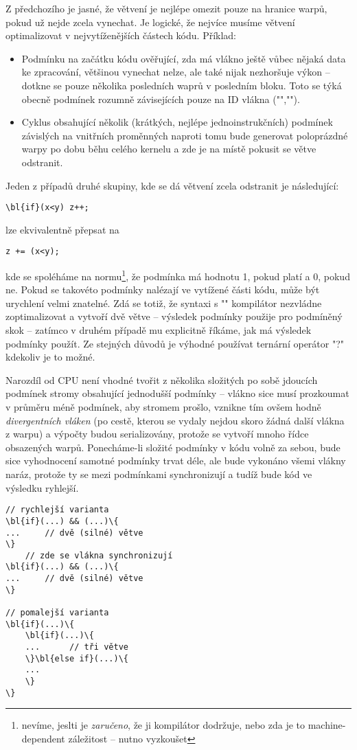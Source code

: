         Z předchozího je jasné, že větvení je nejlépe omezit pouze na hranice warpů, pokud už nejde zcela vynechat. Je logické, že nejvíce musíme větvení optimalizovat v nejvytíženějších částech kódu. Příklad:
        \begin{itemize}
        \item Podmínku na začátku kódu ověřující, zda má vlákno ještě vůbec nějaká data ke zpracování, většinou vynechat nelze, ale také nijak nezhoršuje výkon -- dotkne se pouze několika posledních waprů v posledním bloku. Toto se týká obecně podmínek rozumně závisejících pouze na ID vlákna (\Vr"",\Vr"").
        \item Cyklus obsahující několik (krátkých, nejlépe jednoinstrukčních) podmínek závislých na vnitřních proměnných naproti tomu bude generovat poloprázdné warpy po dobu běhu celého kernelu a zde je na místě pokusit se větve odstranit.
        \end{itemize}
        Jeden z případů druhé skupiny, kde se dá větvení zcela odstranit je následující:
        \begin{Verbatim}[commandchars = \\\{\}]
\bl{if}(x<y) z++;
        \end{Verbatim}
        lze ekvivalentně přepsat na
        \begin{Verbatim}[commandchars = \\\{\}]
z += (x<y);
        \end{Verbatim}
        kde se spoléháme na normu\footnote{nevíme, jeslti je \emph{zaručeno}, že ji kompilátor dodržuje, nebo zda je to machine-dependent záležitost -- nutno vyzkoušet}, že podmínka má hodnotu 1, pokud platí a 0, pokud ne. Pokud se takovéto podmínky nalézají ve vytížené části kódu, může být urychlení velmi znatelné. Zdá se totiž, že syntaxi s \Vr"" kompilátor nezvládne zoptimalizovat a vytvoří dvě větve -- výsledek podmínky použije pro podmíněný skok -- zatímco v druhém případě mu explicitně říkáme, jak má výsledek podmínky použít. Ze stejných důvodů je výhodné používat ternární operátor \Vr"?" kdekoliv je to možné.

        Narozdíl od CPU není vhodné tvořit z několika složitých po sobě jdoucích podmínek stromy obsahující jednodušší podmínky -- vlákno sice musí prozkoumat v průměru méně podmínek, aby stromem prošlo, vznikne tím ovšem hodně \emph{divergentních vláken} (po cestě, kterou se vydaly nejdou skoro žádná další vlákna z warpu) a výpočty budou serializovány, protože se vytvoří mnoho řídce obsazených warpů. Ponecháme-li složité podmínky v kódu volně za sebou, bude sice vyhodnocení samotné podmínky trvat déle, ale bude vykonáno všemi vlákny naráz, protože ty se mezi podmínkami synchronizují a tudíž bude kód ve výsledku ryhlejší.
        \begin{Verbatim}[commandchars = \\\{\}]
// rychlejší varianta
\bl{if}(...) && (...)\{
...     // dvě (silné) větve
\}
    // zde se vlákna synchronizují
\bl{if}(...) && (...)\{
...     // dvě (silné) větve
\}

// pomalejší varianta
\bl{if}(...)\{
    \bl{if}(...)\{
    ...      // tři větve
    \}\bl{else if}(...)\{
    ...
    \}
\}
        \end{Verbatim}

